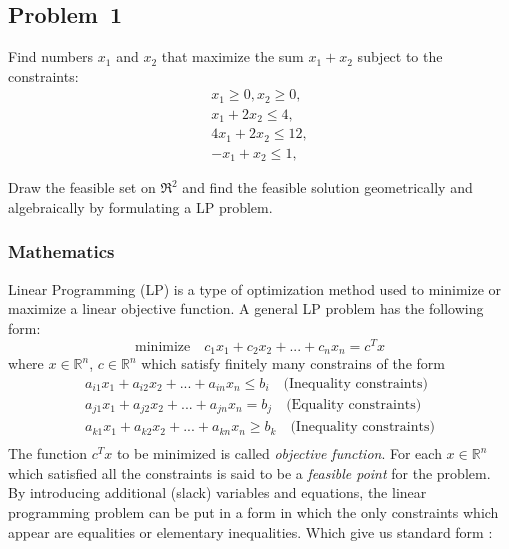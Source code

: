 \subsection{Problem~1}%
\label{problem:1}

Find numbers $x_1$ and $x_2$ that maximize the sum $x_1 + x_2$ subject to the constraints:
\begin{equation*}
    \begin{split}
        x_1\geq 0, x_2\geq0,\\
        x_1+2x_2\leq4,\\
        4x_1+2x_2\leq12,\\
        -x_1+x_2\leq1,
    \end{split}
\end{equation*}

Draw the feasible set on $\Re^2$ and find the feasible solution geometrically and algebraically by
formulating a LP problem.

\subsubsection*{Mathematics}
Linear Programming (LP) is a type of optimization method used to minimize or maximize a linear objective function. A general LP problem has the following form:
\begin{equation*}
    \text{minimize}\quad c_1x_1+c_2x_2+...+c_nx_n=c^Tx
\end{equation*}
where $x \in \mathbb{R}^n$, $c \in \mathbb{R}^n$ which satisfy finitely many constrains of the form
\begin{equation*}
    \begin{split}
        a_{i1}x_1+a_{i2}x_2+...+a_{in}x_n\leq b_i \quad \text{(Inequality constraints)}\\
        a_{j1}x_1+a_{j2}x_2+...+a_{jn}x_n = b_j\quad \text{(Equality constraints)}\\
        a_{k1}x_1+a_{k2}x_2+...+a_{kn}x_n\geq b_k\quad \text{(Inequality constraints)}\\
    \end{split}
\end{equation*}
The function $c^Tx$ to be minimized is called \textit{objective function}. For each $x \in \mathbb{R}^n$ which satisfied all the constraints  is said to be a \textit{feasible point} for the problem. By introducing additional (slack) variables and equations, the linear programming problem can be put in a form in which the only constraints which appear are equalities or elementary inequalities. Which give us standard form :

